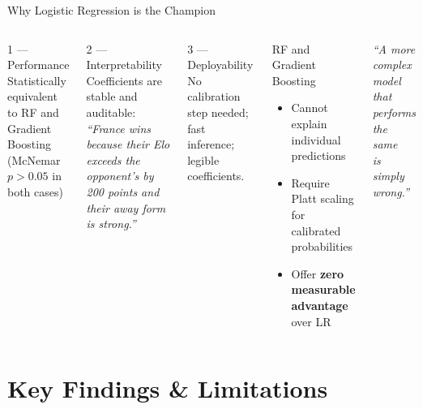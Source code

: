 \documentclass[10pt,aspectratio=169]{beamer}
\begin{document}
\begin{frame}{Why Logistic Regression is the Champion}
  \begin{columns}[T]
      \begin{block}{1 --- Performance}
        Statistically equivalent to RF and Gradient Boosting \\
        (McNemar $p > 0.05$ in both cases)
      \end{block}
      \smallskip
      \begin{block}{2 --- Interpretability}
        Coefficients are stable and auditable:\\[4pt]
        \small\textit{``France wins because their Elo exceeds the opponent's by 200 points
        and their away form is strong.''}
      \end{block}
      \smallskip
      \begin{block}{3 --- Deployability}
        No calibration step needed; fast inference; legible coefficients.
      \end{block}

      \begin{alertblock}{RF and Gradient Boosting}
        \begin{itemize}
          \item Cannot explain individual predictions
          \item Require Platt scaling for calibrated probabilities
          \item Offer \textbf{zero measurable advantage} over LR
        \end{itemize}
      \end{alertblock}

      \bigskip
      \begin{center}
        \textit{``A more complex model\\that performs the same\\is simply wrong.''}
      \end{center}
  \end{columns}
\end{frame}

\section{Key Findings \& Limitations}
\end{document}
